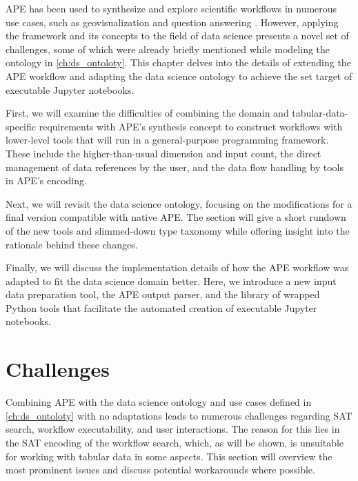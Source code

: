 APE has been used to synthesize and explore scientific workflows in numerous use cases, such as geovisualization and question answering \cite{kasalica2022synthesis}. However, applying the framework and its concepts to the field of data science presents a novel set of challenges, some of which were already briefly mentioned while modeling the ontology in \autoref{ch:ds_ontoloty}. This chapter delves into the details of extending the APE workflow and adapting the data science ontology to achieve the set target of executable Jupyter notebooks.

First, we will examine the difficulties of combining the domain and tabular-data-specific requirements with APE’s synthesis concept to construct workflows with lower-level tools that will run in a general-purpose programming framework. These include the higher-than-usual dimension and input count, the direct management of data references by the user, and the data flow handling by tools in APE’s encoding.

Next, we will revisit the data science ontology, focusing on the modifications for a final version compatible with native APE. The section will give a short rundown of the new tools and slimmed-down type taxonomy while offering insight into the rationale behind these changes.

Finally, we will discuss the implementation details of how the APE workflow was adapted to fit the data science domain better. Here, we introduce a new input data preparation tool, the APE output parser, and the library of wrapped Python tools that facilitate the automated creation of executable Jupyter notebooks.

\section{Challenges}\label{sec:native_ape_challenges}
Combining APE with the data science ontology and use cases defined in \autoref{ch:ds_ontoloty} with no adaptations leads to numerous challenges regarding SAT search, workflow executability, and user interactions. The reason for this lies in the SAT encoding of the workflow search, which, as will be shown, is unsuitable for working with tabular data in some aspects. This section will overview the most prominent issues and discuss potential workarounds where possible.

